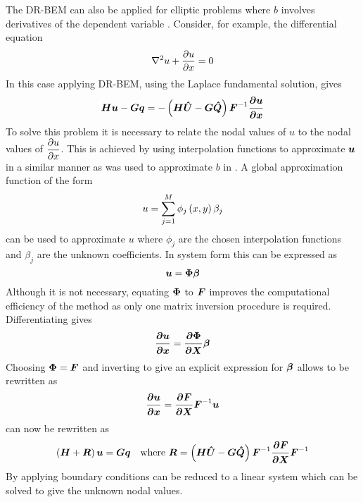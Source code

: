 The DR-BEM can also be applied for elliptic problems where
$b$ involves derivatives of the dependent variable
\citep{partridge:1992}. Consider, for example, the differential equation 
\begin{equation}
  \laplacian{}{u} + \delby{u}{x} = 0
\end{equation}
In this case applying DR-BEM, using the Laplace fundamental solution, gives
\begin{equation}
  \matr{H} \vect{u} - \matr{G} \vect{q} = - \pbrac{\matr{H} \matr{\hat{U}} -
    \matr{G} \matr{\hat{Q}}} \matr{F}^{-1} \vect{\delby{u}{x}}
\end{equation}
To solve this problem it is necessary to relate the nodal values of $u$ to
the nodal values of $ \dfrac{\partial u}{\partial x} $. This is achieved by
using interpolation functions to approximate $\vect{u}$ in a similar manner
as was used to approximate $b$ in .  A global
approximation function of the form
\begin{equation}
  u =  \displaystyle\sum_{j=1}^{M}   \phi_{j}\left( x,y \right)  \beta_{j}
\end{equation}
can be used to approximate $u$ where $\phi_{j}$ are the chosen
interpolation functions and $\beta_{j}$ are the unknown coefficients.  In
system form this can be expressed as
\begin{equation}
  \vect{u} = \matr{\Phi} \vect{\beta}
  \label{eq:uapprox}
\end{equation}
Although it is not necessary, equating $\matr{\Phi}$ to $\matr{F}$ 
improves the computational efficiency of the method as only one matrix 
inversion procedure is required. Differentiating  gives 
\begin{equation}
  \vect{\delby{u}{x}} = \matr{\delby{\Phi}{x}} \vect{\beta}
  \label{eq:uappder}
\end{equation}
Choosing $\matr{\Phi} = \matr{F}$ and inverting  to give an
explicit expression for $\vect{\beta}$ allows  to be
rewritten as
\begin{equation}
  \vect{\delby{u}{x}} = \matr{\delby{F}{x}} \matr{F}^{-1} \vect{u}
  \label{eq:dudxexp}
\end{equation}
 can now be rewritten as
\begin{equation}
  \pbrac{\matr{H} + \matr{R}} \vect{u} = \matr{G}
  \vect{q}\quad\text{where }\matr{R} = \pbrac{\matr{H} \matr{\hat{U}}
    - \matr{G} \matr{\hat{Q}}} \matr{F}^{-1} \matr{\delby{F}{x}}
  \matr{F}^{-1}
\label{eq:drmderiv}
\end{equation}
By applying boundary conditions  can be reduced to 
a linear system which can be solved to give the unknown nodal values.

